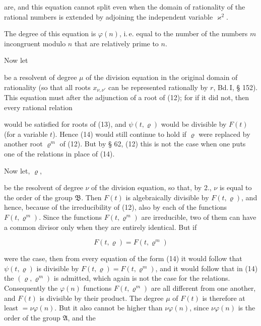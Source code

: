 are, and this equation cannot split even when the domain of rationality of the rational numbers is extended by adjoining the independent variable $\varkappa^2$. %

The degree of this equation is $\varphi(n)$, i.\,e. equal to the number of the numbers $m$ incongruent modulo $n$ that are relatively prime to $n$.

Now let


be a  resolvent of degree $\mu$ of the division equation in the original domain of rationality (so that all roots $x_{\nu,\nu'}$ can be represented rationally by $r$, Bd.\,I, § 152). This equation must  after the adjunction of a root of (12); for if it did not, then every rational relation


would be satisfied for  roots of (13), and $\psi(t,\varrho)$ would be divisible by $F(t)$ (for a variable $t$). Hence (14) would still continue to hold if $\varrho$ were replaced by another root $\varrho^m$ of (12). But by § 62, (12) this is not the case when one puts one of the  relations in place of (14).

Now let,  $\varrho$,


be the  resolvent of degree $\nu$ of the division equation, so that, by 2., $\nu$ is equal to the order of the group $\mathfrak{B}$. Then $F(t)$ is algebraically divisible by $F(t,\varrho)$, and hence, because of the irreducibility of (12), also by each of the functions $F(t,\varrho^m)$. Since the functions $F(t,\varrho^m)$ are irreducible, two of them can have a common divisor only when they are entirely identical. But if

\[
F(t,\varrho) = F(t,\varrho^m)
\]

were the case, then from every equation of the form (14) it would follow that $\psi(t,\varrho)$ is divisible by $F(t,\varrho) = F(t,\varrho^m)$, and it would follow that in (14) the  $(\varrho,\varrho^m)$ is admitted, which again is not the case for the  relations. Consequently the $\varphi(n)$ functions $F(t,\varrho^m)$ are all different from one another, and $F(t)$ is divisible by their product. The degree $\mu$ of $F(t)$ is therefore at least $= \nu\varphi(n)$. But it also cannot be higher than $\nu\varphi(n)$, since $\nu\varphi(n)$ is the order of the group $\mathfrak{A}$, and the
